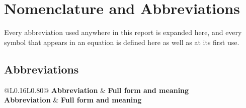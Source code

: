 \chapter*{Nomenclature and Abbreviations}

Every abbreviation used anywhere in this report is expanded here, and every
symbol that appears in an equation is defined here as well as at its first use.

\section*{Abbreviations}

\begin{longtable}{@{}L{0.16\textwidth}L{0.80\textwidth}@{}}
\toprule
\textbf{Abbreviation} & \textbf{Full form and meaning} \\
\midrule
\endfirsthead
\toprule
\textbf{Abbreviation} & \textbf{Full form and meaning} \\
\midrule
\endhead
\bottomrule
\endfoot


\end{longtable}

